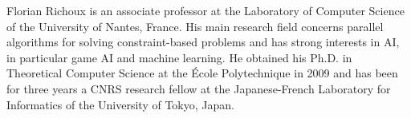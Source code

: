 \documentclass[journal]{IEEEtran}
\begin{document}
\begin{IEEEbiographynophoto}{Florian Richoux}
  is an associate  professor at the Laboratory of  Computer Science of
  the University of Nantes,  France.  His main research field concerns
  parallel  algorithms for solving  constraint-based problems  and has
  strong  interests   in  AI,  in  particular  game   AI  and  machine
  learning. He  obtained his Ph.D. in Theoretical  Computer Science at
  the {\'E}cole Polytechnique  in 2009 and has been  for three years a
  CNRS   research  fellow  at   the  Japanese-French   Laboratory  for
  Informatics of the University of Tokyo, Japan.
\end{IEEEbiographynophoto}
\end{document}
